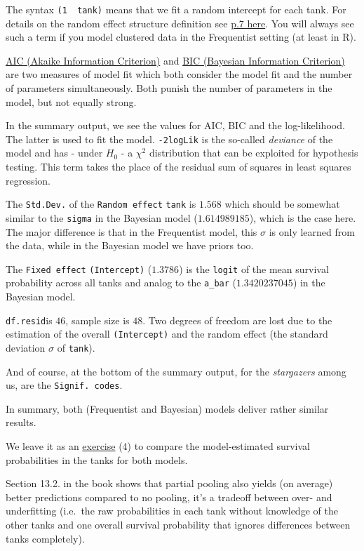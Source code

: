 \documentclass[
]{book}
\begin{document}
The syntax \texttt{(1\ \textbar{}\ tank)} means that we fit a random intercept for each tank.
For details on the random effect structure definition see
\href{https://cran.r-project.org/web/packages/lme4/vignettes/lmer.pdf}{p.7 here}.
You will always see such a term if you model clustered data in the Frequentist
setting (at least in R).

\href{https://en.wikipedia.org/wiki/Akaike_information_criterion}{AIC (Akaike Information Criterion)}
and \href{https://en.wikipedia.org/wiki/Bayesian_information_criterion}{BIC (Bayesian Information Criterion)}
are two measures of model fit which both consider the model fit and the number
of parameters simultaneously. Both punish the number of parameters in the model,
but not equally strong.

In the summary output, we see the values for AIC, BIC and the log-likelihood.
The latter is used to fit the model. \texttt{-2logLik} is the so-called \emph{deviance} of
the model and has - under \(H_0\) - a \(\chi^2\) distribution that can be exploited
for hypothesis testing. This term takes the place of the residual sum of squares
in least squares regression.

The \texttt{Std.Dev.} of the \texttt{Random\ effect} \texttt{tank} is \(1.568\) which should be somewhat similar
to the \texttt{sigma} in the Bayesian model (\(1.614989185\)), which is the case here.
The major difference is that in the Frequentist model, this \(\sigma\) is only
learned from the data, while in the Bayesian model we have priors too.

The \texttt{Fixed\ effect} \texttt{(Intercept)} (\(1.3786\)) is the \texttt{logit} of the mean survival probability
across all tanks and analog to the \texttt{a\_bar} (\(1.3420237045\)) in the Bayesian model.

\texttt{df.resid}is \(46\), sample size is \(48\). Two degrees of freedom are lost due
to the estimation of the overall \texttt{(Intercept)} and the random effect (the standard
deviation \(\sigma\) of \texttt{tank}).

And of course, at the bottom of the summary output, for the \emph{stargazers} among us, are the \texttt{Signif.\ codes}.

In summary, both (Frequentist and Bayesian) models deliver rather similar results.

We leave it as an \hyperref[exercise4_LMM]{exercise} (4) to compare the model-estimated survival probabilities
in the tanks for both models.

Section 13.2. in the book shows that partial pooling also yields (on average) better
predictions compared to no pooling, it's a tradeoff between over- and underfitting
(i.e.~the raw probabilities in each tank without knowledge of the other tanks and one
overall survival probability that ignores differences between tanks completely).
\end{document}
